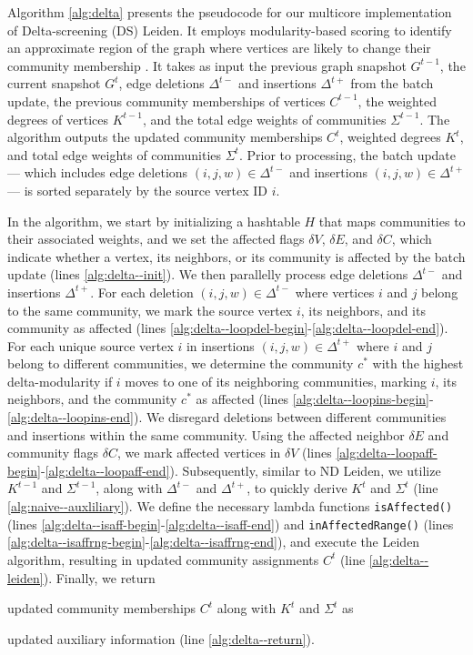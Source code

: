 Algorithm \ref{alg:delta} presents the pseudocode for our multicore implementation of Delta-screening (DS) Leiden. It employs modularity-based scoring to identify an approximate region of the graph where vertices are likely to change their community membership \cite{com-zarayeneh21}. It takes as input the previous graph snapshot $G^{t-1}$, the current snapshot $G^t$, edge deletions $\Delta^{t-}$ and insertions $\Delta^{t+}$ from the batch update, the previous community memberships of vertices $C^{t-1}$, the weighted degrees of vertices $K^{t-1}$, and the total edge weights of communities $\Sigma^{t-1}$. The algorithm outputs the updated community memberships $C^t$, weighted degrees $K^t$, and total edge weights of communities $\Sigma^t$. Prior to processing, the batch update --- which includes edge deletions $(i, j, w) \in \Delta^{t-}$ and insertions $(i, j, w) \in \Delta^{t+}$ --- is sorted separately by the source vertex ID $i$.




In the algorithm, we start by initializing a hashtable $H$ that maps communities to their associated weights, and we set the affected flags $\delta V$, $\delta E$, and $\delta C$, which indicate whether a vertex, its neighbors, or its community is affected by the batch update (lines \ref{alg:delta--init}). We then parallelly process edge deletions $\Delta^{t-}$ and insertions $\Delta^{t+}$. For each deletion $(i, j, w) \in \Delta^{t-}$ where vertices $i$ and $j$ belong to the same community, we mark the source vertex $i$, its neighbors, and its community as affected (lines \ref{alg:delta--loopdel-begin}-\ref{alg:delta--loopdel-end}). For each unique source vertex $i$ in insertions $(i, j, w) \in \Delta^{t+}$ where $i$ and $j$ belong to different communities, we determine the community $c^*$ with the highest delta-modularity if $i$ moves to one of its neighboring communities, marking $i$, its neighbors, and the community $c^*$ as affected (lines \ref{alg:delta--loopins-begin}-\ref{alg:delta--loopins-end}). We disregard deletions between different communities and insertions within the same community. Using the affected neighbor $\delta E$ and community flags $\delta C$, we mark affected vertices in $\delta V$ (lines \ref{alg:delta--loopaff-begin}-\ref{alg:delta--loopaff-end}). Subsequently, similar to ND Leiden, we utilize $K^{t-1}$ and $\Sigma^{t-1}$, along with $\Delta^{t-}$ and $\Delta^{t+}$, to quickly derive $K^t$ and $\Sigma^t$ (line \ref{alg:naive--auxliliary}). We define the necessary lambda functions \texttt{isAffected()} (lines \ref{alg:delta--isaff-begin}-\ref{alg:delta--isaff-end}) and \texttt{inAffectedRange()} (lines \ref{alg:delta--isaffrng-begin}-\ref{alg:delta--isaffrng-end}), and execute the Leiden algorithm, resulting in updated community assignments $C^t$ (line \ref{alg:delta--leiden}). Finally, we return updated community memberships $C^t$ along with $K^t$ and $\Sigma^t$ as updated auxiliary information (line \ref{alg:delta--return}).




